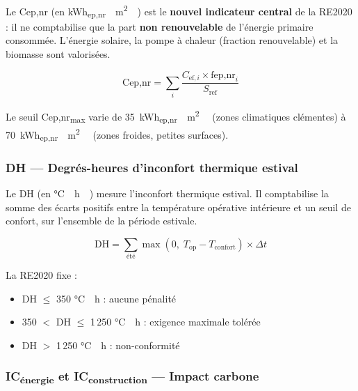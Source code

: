 \begin{definition}[title=Cep,nr — Indicateur clé RE2020]
Le Cep,nr (en \si{\kWh_{ep,nr} \per \m^2 \per \year}) est le \textbf{nouvel indicateur central} de la RE2020 : il ne comptabilise que la part \textbf{non renouvelable} de l'énergie primaire consommée. L'énergie solaire, la pompe à chaleur (fraction renouvelable) et la biomasse sont valorisées.
\end{definition}

\begin{equation}
  \text{Cep,nr} = \sum_{i} \frac{C_{\text{ef},i} \times \text{fep,nr}_i}{S_{\text{ref}}}
\end{equation}

Le seuil Cep,nr\textsubscript{max} varie de \SI{35}{\kWh_{ep,nr} \per \m^2 \per \year} (zones climatiques clémentes) à \SI{70}{\kWh_{ep,nr} \per \m^2 \per \year} (zones froides, petites surfaces).

\subsubsection{DH — Degrés-heures d'inconfort thermique estival}

\begin{definition}[title=DH — Indicateur de confort d'été]
Le DH (en \si{\degreeCelsius \cdot h \per \year}) mesure l'inconfort thermique estival. Il comptabilise la somme des écarts positifs entre la température opérative intérieure et un seuil de confort, sur l'ensemble de la période estivale.
\end{definition}

\begin{equation}
  \text{DH} = \sum_{\text{été}} \max\!\left(0,\; T_{\text{op}} - T_{\text{confort}}\right) \times \Delta t
\end{equation}

La RE2020 fixe :
\begin{itemize}
  \item DH $\leq$ 350 \si{\degreeCelsius \cdot h} : aucune pénalité
  \item 350 $<$ DH $\leq$ 1\,250 \si{\degreeCelsius \cdot h} : exigence maximale tolérée
  \item DH $>$ 1\,250 \si{\degreeCelsius \cdot h} : non-conformité
\end{itemize}

\subsubsection{IC\textsubscript{énergie} et IC\textsubscript{construction} — Impact carbone}

